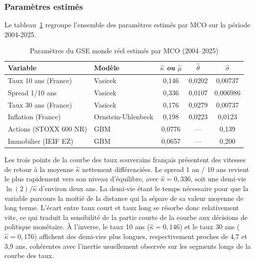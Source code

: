\subsubsection{Paramètres estimés}

Le tableau~\ref{tab:parametres_gse_MCO} regroupe l'ensemble des paramètres estimés par MCO sur la période 2004-2025.

\begin{table}[H]
\centering
\caption{Paramètres du GSE monde réel estimés par MCO (2004–2025)}
\label{tab:parametres_gse_MCO}
\begin{tabular}{llccc}
\hline
\textbf{Variable} & \textbf{Modèle} & $\hat{\kappa}$ \textit{ou} $\hat{\mu}$ & $\hat{\theta}$ & $\hat{\sigma}$ \\
\hline
Taux 10 ans (France)   & Vasicek & 0,146 & 0,0202 & 0,00737 \\
Spread 1/10 ans   & Vasicek & 0,336 & 0,0107 & 0,006986 \\
Taux 30 ans (France)   & Vasicek & 0,176 & 0,0279 & 0,00737 \\
Inflation (France)     & Ornstein-Uhlenbeck & 0,198 & 0,0223 & 0,0123 \\
Actions (STOXX 600 NR) & GBM & 0,0776 & — & 0,139 \\
Immobilier (IEIF EZ)   & GBM & 0,0657 & — & 0,200 \\
\hline
\end{tabular}
\end{table}


Les trois points de la courbe des taux souverains français présentent des vitesses de retour à la moyenne $\hat{\kappa}$ nettement différenciées. Le spread 1 an / 10 ans revient le plus rapidement vers son niveau d'équilibre, avec $\hat{\kappa} = 0{,}336$, soit une demi-vie $\ln(2)/\hat{\kappa}$ d'environ deux ans. La demi-vie étant le temps nécessaire pour que la variable parcours la moitié de la distance qui la sépare de sa valeur moyenne de long terme. L'écart entre taux court et taux long se résorbe donc relativement vite, ce qui traduit la sensibilité de la partie courte de la courbe aux décisions de politique monétaire. À l'inverse, le taux 10 ans ($\hat{\kappa} = 0{,}146$) et le taux 30 ans ($\hat{\kappa} = 0{,}176$) affichent des demi-vies plus longues, respectivement proches de 4{,}7 et 3{,}9 ans, cohérentes avec l'inertie usuellement observée sur les segments longs de la courbe des taux.

